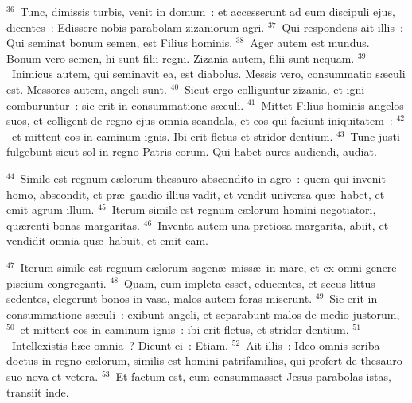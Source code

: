 ${}^{36}$~Tunc, dimissis turbis, venit in domum~: et accesserunt ad eum discipuli ejus, dicentes~: Edissere nobis parabolam zizaniorum agri.
${}^{37}$~Qui respondens ait illis~: Qui seminat bonum semen, est Filius hominis.
${}^{38}$~Ager autem est mundus. Bonum vero semen, hi sunt filii regni. Zizania autem, filii sunt nequam.
${}^{39}$~Inimicus autem, qui seminavit ea, est diabolus. Messis vero, consummatio s\ae culi est. Messores autem, angeli sunt.
${}^{40}$~Sicut ergo colliguntur zizania, et igni comburuntur~: sic erit in consummatione s\ae culi.
${}^{41}$~Mittet Filius hominis angelos suos, et colligent de regno ejus omnia scandala, et eos qui faciunt iniquitatem~:
${}^{42}$~et mittent eos in caminum ignis. Ibi erit fletus et stridor dentium.
${}^{43}$~Tunc justi fulgebunt sicut sol in regno Patris eorum. Qui habet aures audiendi, audiat.


${}^{44}$~Simile est regnum c\ae lorum thesauro abscondito in agro~: quem qui invenit homo, abscondit, et pr\ae\ gaudio illius vadit, et vendit universa qu\ae\ habet, et emit agrum illum.
${}^{45}$~Iterum simile est regnum c\ae lorum homini negotiatori, qu\ae renti bonas margaritas.
${}^{46}$~Inventa autem una pretiosa margarita, abiit, et vendidit omnia qu\ae\ habuit, et emit eam.


${}^{47}$~Iterum simile est regnum c\ae lorum sagen\ae\ miss\ae\ in mare, et ex omni genere piscium congreganti.
${}^{48}$~Quam, cum impleta esset, educentes, et secus littus sedentes, elegerunt bonos in vasa, malos autem foras miserunt.
${}^{49}$~Sic erit in consummatione s\ae culi~: exibunt angeli, et separabunt malos de medio justorum,
${}^{50}$~et mittent eos in caminum ignis~: ibi erit fletus, et stridor dentium.
${}^{51}$~Intellexistis h\ae c omnia~? Dicunt ei~: Etiam.
${}^{52}$~Ait illis~: Ideo omnis scriba doctus in regno c\ae lorum, similis est homini patrifamilias, qui profert de thesauro suo nova et vetera.
${}^{53}$~Et factum est, cum consummasset Jesus parabolas istas, transiit inde.


